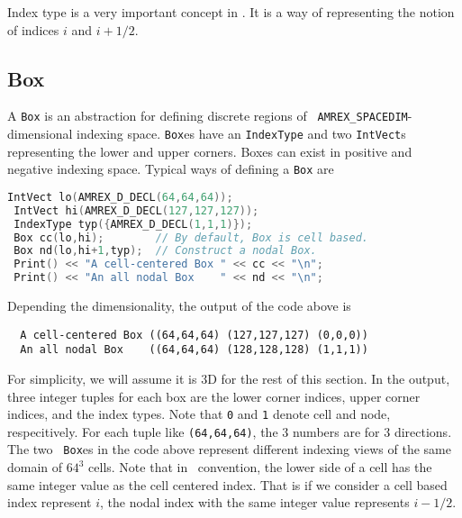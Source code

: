 Index type is a very important concept in \amrex.  It is a way of
representing the notion of indices $i$ and $i+1/2$.  

\subsection{Box}

A {\tt Box} is an abstraction for defining discrete regions of {\tt
  AMREX\_SPACEDIM}-dimensional indexing space.  {\tt Box}es have an
{\tt IndexType} and two {\tt IntVect}s representing the lower and
upper corners.  Boxes can exist in positive and negative indexing
space.   Typical ways of defining a {\tt Box} are
\begin{lstlisting}[language=cpp]
 IntVect lo(AMREX_D_DECL(64,64,64));
 IntVect hi(AMREX_D_DECL(127,127,127));
 IndexType typ({AMREX_D_DECL(1,1,1)});
 Box cc(lo,hi);        // By default, Box is cell based.
 Box nd(lo,hi+1,typ);  // Construct a nodal Box.
 Print() << "A cell-centered Box " << cc << "\n";
 Print() << "An all nodal Box    " << nd << "\n";
\end{lstlisting}
Depending the dimensionality, the output of the code above is
\begin{verbatim}
  A cell-centered Box ((64,64,64) (127,127,127) (0,0,0))
  An all nodal Box    ((64,64,64) (128,128,128) (1,1,1))
\end{verbatim}
For simplicity, we will assume it is 3D for the rest of this section.
In the output, three integer tuples for each box are the lower corner
indices, upper corner indices, and the index types.  Note that {\tt 0}
and {\tt 1} denote cell and node, respecitively.  For each tuple like
{\tt (64,64,64)}, the 3 numbers are for 3 directions.  The two {\tt
  Box}es in the code above represent different indexing views of the
same domain of $64^3$ cells.  Note that in \amrex\ convention, the
lower side of a cell has the same integer value as the cell centered
index.  That is if we consider a cell based index represent $i$, the
nodal index with the same integer value represents $i-1/2$.  

